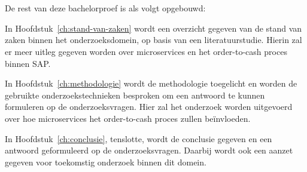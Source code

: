 \section{}
\label{sec:opzet-bachelorproef}


De rest van deze bachelorproef is als volgt opgebouwd:

In Hoofdstuk~\ref{ch:stand-van-zaken} wordt een overzicht gegeven van de stand van zaken binnen het onderzoeksdomein, op basis van een literatuurstudie. Hierin zal er meer uitleg gegeven worden over microservices en het order-to-cash proces binnen SAP.

In Hoofdstuk~\ref{ch:methodologie} wordt de methodologie toegelicht en worden de gebruikte onderzoekstechnieken besproken om een antwoord te kunnen formuleren op de onderzoeksvragen. Hier zal het onderzoek worden uitgevoerd over hoe microservices het order-to-cash proces zullen beïnvloeden.


In Hoofdstuk~\ref{ch:conclusie}, tenslotte, wordt de conclusie gegeven en een antwoord geformuleerd op de onderzoeksvragen. Daarbij wordt ook een aanzet gegeven voor toekomstig onderzoek binnen dit domein.
